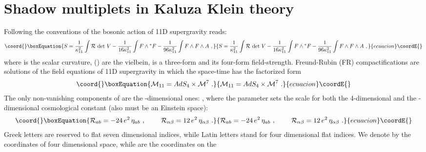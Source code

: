 \documentclass[a4paper,11pt]{article}
\begin{document}
\section{Shadow multiplets in Kaluza Klein
theory}\label{secshadow}
Following the conventions of \cite{ricpie11} the bosonic action of
11D supergravity reads:
\begin{equation}\coord{}\boxEquation{
\label{boslag11} S = {1\over \kappa_{11}^2} \int {\cal R}\, \det\,
V  - {1\over 16 \kappa_{11}^2} \int F \wedge {}^* F - {1\over 96
\kappa_{11}^2} \int F\wedge F\wedge A~,
}{
S = {1\over \kappa_{11}^2} \int {\cal R}\, \det\,
V  - {1\over 16 \kappa_{11}^2} \int F \wedge {}^* F - {1\over 96
\kappa_{11}^2} \int F\wedge F\wedge A~,
}{ecuacion}\coordE{}\end{equation}
where \coordHE{} is the scalar curvature, \coordHE{} (\coordHE{}) are the vielbein, \coordHE{} is a three-form and \coordHE{} its four-form
field-strength. Freund-Rubin (FR) compactifications
\cite{FreundRubin} are solutions of the field equations of 11D
supergravity in which the space-time \coordHE{} has the
factorized form
\begin{equation}\coord{}\boxEquation{
\label{11=4+7} {\cal M}_{11}=AdS_4\times {\cal M}^7~.
}{
{\cal M}_{11}=AdS_4\times {\cal M}^7~.
}{ecuacion}\coordE{}\end{equation}
The only non-vanishing components of \coordHE{} are the \coordHE{}-dimensional
ones: \coordHE{}, where the parameter \coordHE{}
sets the scale for both the 4-dimensional and the \coordHE{}-dimensional
cosmological constant (also \coordHE{} must be an Einstein
space):
\begin{equation}\coord{}\boxEquation{
\label{cosmol4e7} {\cal R}_{ab} = -24\, e^2\, \eta_{ab}~,\hskip
0.8cm {\cal R}_{\alpha\beta} = 12\, e^2\, \eta_{\alpha\beta}~.
}{
{\cal R}_{ab} = -24\, e^2\, \eta_{ab}~,\hskip
0.8cm {\cal R}_{\alpha\beta} = 12\, e^2\, \eta_{\alpha\beta}~.
}{ecuacion}\coordE{}\end{equation}
Greek letters \myHighlight{$\alpha,\beta,\ldots$}\coordHE{} are reserved to flat seven
dimensional indices, while Latin letters \coordHE{} stand for
four dimensional flat indices. We denote by \coordHE{} the coordinates of
four dimensional space, while \coordHE{} are the coordinates on the
\end{document}
